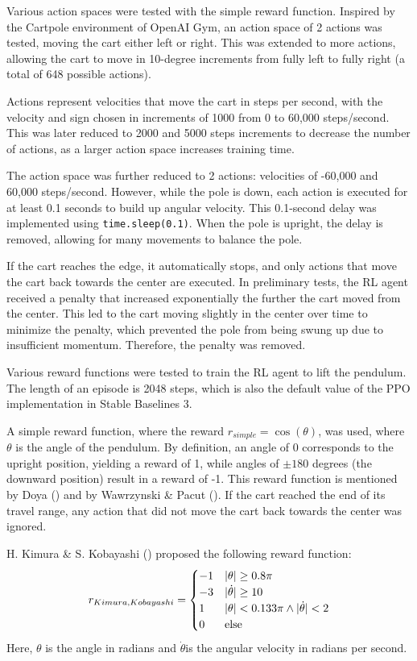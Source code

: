 Various action spaces were tested with the simple reward function. Inspired by the Cartpole environment of OpenAI Gym, an action space of 2 actions was tested, moving the cart either left or right. This was extended to more actions, allowing the cart to move in 10-degree increments from fully left to fully right (a total of 648 possible actions).

Actions represent velocities that move the cart in steps per second, with the velocity and sign chosen in increments of 1000 from 0 to 60,000 steps/second. This was later reduced to 2000 and 5000 steps increments to decrease the number of actions, as a larger action space increases training time.

The action space was further reduced to 2 actions: velocities of -60,000 and 60,000 steps/second. However, while the pole is down, each action is executed for at least 0.1 seconds to build up angular velocity. This 0.1-second delay was implemented using \texttt{time.sleep(0.1)}. When the pole is upright, the delay is removed, allowing for many movements to balance the pole.

If the cart reaches the edge, it automatically stops, and only actions that move the cart back towards the center are executed. In preliminary tests, the RL agent received a penalty that increased exponentially the further the cart moved from the center. This led to the cart moving slightly in the center over time to minimize the penalty, which prevented the pole from being swung up due to insufficient momentum. Therefore, the penalty was removed.

Various reward functions were tested to train the RL agent to lift the pendulum. The length of an episode is 2048 steps, which is also the default value of the PPO implementation in Stable Baselines 3.

A simple reward function, where the reward $r_{simple}=\cos(\theta)$, was used, where $\theta$ is the angle of the pendulum. By definition, an angle of 0 corresponds to the upright position, yielding a reward of 1, while angles of $\pm 180$ degrees (the downward position) result in a reward of -1. This reward function is mentioned by Doya (\citeyear{doya_reinforcement_2000}) and by Wawrzynski \& Pacut (\citeyear{wawrzynski_model-free_2004}). If the cart reached the end of its travel range, any action that did not move the cart back towards the center was ignored.

H. Kimura \& S. Kobayashi (\citeyear{kimura_stochastic_1999}) proposed the following reward function:
\begin{align}
    r_{Kimura,Kobayashi} = \begin{cases}
        -1 & \vert\theta\vert \ge 0.8\pi \\
        -3 & \vert\dot{\theta}\vert \ge 10 \\
        1 & \vert\theta\vert < 0.133\pi \land \vert\dot{\theta}\vert < 2 \\ 
        0 & \text{else}
    \end{cases}\notag
\end{align} 
Here, $\theta$ is the angle in radians and $\dot{\theta}$is the angular velocity in radians per second.

